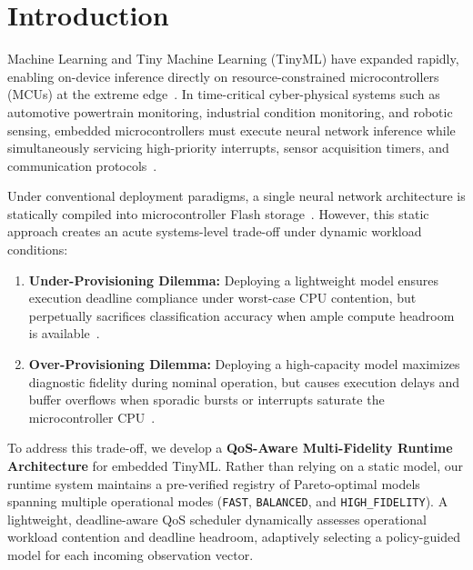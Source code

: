 \documentclass[journal]{IEEEtran}
\begin{document}
\maketitle
\IEEEdisplaynontitleabstractindextext

\section{Introduction}
 Machine Learning and Tiny Machine Learning (TinyML) have expanded rapidly, enabling on-device inference directly on resource-constrained microcontrollers (MCUs) at the extreme edge~\cite{warden2019tinyml,ray2022review,mohammed2023tinyml}. In time-critical cyber-physical systems such as automotive powertrain monitoring, industrial condition monitoring, and robotic sensing, embedded microcontrollers must execute neural network inference while simultaneously servicing high-priority interrupts, sensor acquisition timers, and communication protocols~\cite{dutta2021tinyml,banbury2021benchmarking}.

Under conventional deployment paradigms, a single neural network architecture is statically compiled into microcontroller Flash storage~\cite{david2021tensorflow,lin2020mcunet,lin2021mcunetv2}. However, this static approach creates an acute systems-level trade-off under dynamic workload conditions:
\begin{enumerate}
    \item \textbf{Under-Provisioning Dilemma:} Deploying a lightweight model ensures execution deadline compliance under worst-case CPU contention, but perpetually sacrifices classification accuracy when ample compute headroom is available~\cite{sze2017efficient,liberis2021munas}.
    \item \textbf{Over-Provisioning Dilemma:} Deploying a high-capacity model maximizes diagnostic fidelity during nominal operation, but causes execution delays and buffer overflows when sporadic bursts or interrupts saturate the microcontroller CPU~\cite{buttazzo2011hard,lu2002feedback}.
\end{enumerate}

To address this trade-off, we develop a \textbf{QoS-Aware Multi-Fidelity Runtime Architecture} for embedded TinyML. Rather than relying on a static model, our runtime system maintains a pre-verified registry of Pareto-optimal models spanning multiple operational modes (\texttt{FAST}, \texttt{BALANCED}, and \texttt{HIGH\_FIDELITY}). A lightweight, deadline-aware QoS scheduler dynamically assesses operational workload contention and deadline headroom, adaptively selecting a policy-guided model for each incoming observation vector.
\end{document}

